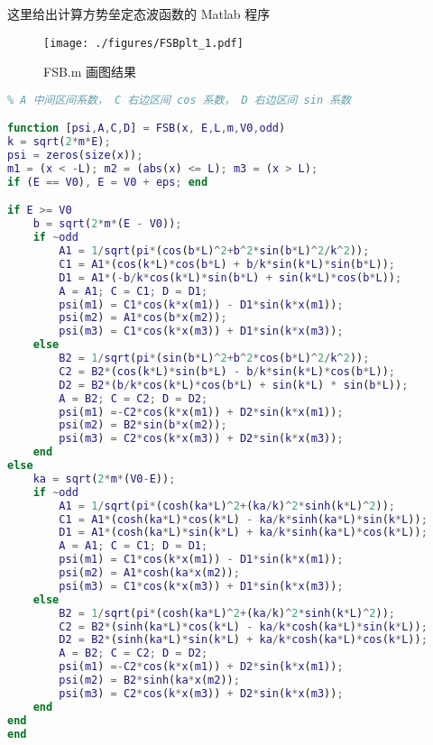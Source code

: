 

这里给出计算方势垒定态波函数的 Matlab 程序
\begin{figure}[ht]
\centering
\texttt{[image: ./figures/FSBplt\_1.pdf]}
\caption{FSB.m 画图结果} \label{FSBplt_fig1}
\end{figure}

\begin{lstlisting}[language=matlab, caption=FSB.m]
% m 质量，V0 势垒，E 能量， L 势垒半宽， odd 奇函数 true 偶函数 false
% A 中间区间系数， C 右边区间 cos 系数， D 右边区间 sin 系数

function [psi,A,C,D] = FSB(x, E,L,m,V0,odd)
k = sqrt(2*m*E);
psi = zeros(size(x));
m1 = (x < -L); m2 = (abs(x) <= L); m3 = (x > L);
if (E == V0), E = V0 + eps; end

if E >= V0
    b = sqrt(2*m*(E - V0));
    if ~odd
        A1 = 1/sqrt(pi*(cos(b*L)^2+b^2*sin(b*L)^2/k^2));
        C1 = A1*(cos(k*L)*cos(b*L) + b/k*sin(k*L)*sin(b*L));
        D1 = A1*(-b/k*cos(k*L)*sin(b*L) + sin(k*L)*cos(b*L));
        A = A1; C = C1; D = D1;
        psi(m1) = C1*cos(k*x(m1)) - D1*sin(k*x(m1));
        psi(m2) = A1*cos(b*x(m2));
        psi(m3) = C1*cos(k*x(m3)) + D1*sin(k*x(m3));
    else
        B2 = 1/sqrt(pi*(sin(b*L)^2+b^2*cos(b*L)^2/k^2));
        C2 = B2*(cos(k*L)*sin(b*L) - b/k*sin(k*L)*cos(b*L));
        D2 = B2*(b/k*cos(k*L)*cos(b*L) + sin(k*L) * sin(b*L));
        A = B2; C = C2; D = D2;
        psi(m1) =-C2*cos(k*x(m1)) + D2*sin(k*x(m1));
        psi(m2) = B2*sin(b*x(m2));
        psi(m3) = C2*cos(k*x(m3)) + D2*sin(k*x(m3));
    end
else
    ka = sqrt(2*m*(V0-E));
    if ~odd
        A1 = 1/sqrt(pi*(cosh(ka*L)^2+(ka/k)^2*sinh(k*L)^2));
        C1 = A1*(cosh(ka*L)*cos(k*L) - ka/k*sinh(ka*L)*sin(k*L));
        D1 = A1*(cosh(ka*L)*sin(k*L) + ka/k*sinh(ka*L)*cos(k*L));
        A = A1; C = C1; D = D1;
        psi(m1) = C1*cos(k*x(m1)) - D1*sin(k*x(m1));
        psi(m2) = A1*cosh(ka*x(m2));
        psi(m3) = C1*cos(k*x(m3)) + D1*sin(k*x(m3));
    else
        B2 = 1/sqrt(pi*(cosh(ka*L)^2+(ka/k)^2*sinh(k*L)^2));
        C2 = B2*(sinh(ka*L)*cos(k*L) - ka/k*cosh(ka*L)*sin(k*L));
        D2 = B2*(sinh(ka*L)*sin(k*L) + ka/k*cosh(ka*L)*cos(k*L));
        A = B2; C = C2; D = D2;
        psi(m1) =-C2*cos(k*x(m1)) + D2*sin(k*x(m1));
        psi(m2) = B2*sinh(ka*x(m2));
        psi(m3) = C2*cos(k*x(m3)) + D2*sin(k*x(m3));
    end
end
end
\end{lstlisting}

